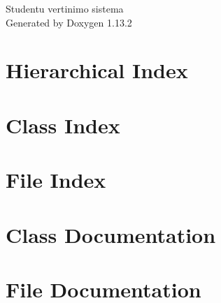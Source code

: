 \documentclass[twoside]{book}
\newcommand{\+}{\discretionary{\mbox{\scriptsize$\hookleftarrow$}}{}{}}
\newcommand{\clearemptydoublepage}{%
    \newpage{\pagestyle{empty}\cleardoublepage}%
  }
\begin{document}
  \raggedbottom
    \hypersetup{pageanchor=false,
                bookmarksnumbered=true,
                pdfencoding=unicode
               }
  \begin{titlepage}
  \vspace*{7cm}
  \begin{center}%
  {\Large Studentu vertinimo sistema}\\
  \vspace*{1cm}
  {\large Generated by Doxygen 1.13.2}\\
  \end{center}
  \end{titlepage}
  \clearemptydoublepage
  \tableofcontents
  \clearemptydoublepage
  \hypersetup{pageanchor=true}
\chapter{Hierarchical Index}

\chapter{Class Index}

\chapter{File Index}

\chapter{Class Documentation}



\chapter{File Documentation}
















  \backmatter
  \newpage
  \clearemptydoublepage
  \printindex
\end{document}
